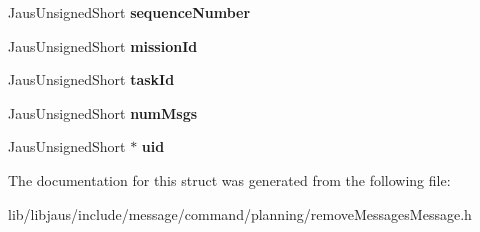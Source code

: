 \begin{DoxyCompactItemize}
\item 
\hypertarget{struct_remove_messages_message_struct_a9c36627b8a4b7d9cde2d80a104b71bc9}{\-Jaus\-Unsigned\-Short {\bfseries sequence\-Number}}\label{struct_remove_messages_message_struct_a9c36627b8a4b7d9cde2d80a104b71bc9}

\item 
\hypertarget{struct_remove_messages_message_struct_a43345f5fb3ca3d9aeff76ec574da9c4e}{\-Jaus\-Unsigned\-Short {\bfseries mission\-Id}}\label{struct_remove_messages_message_struct_a43345f5fb3ca3d9aeff76ec574da9c4e}

\item 
\hypertarget{struct_remove_messages_message_struct_a0add0d12e7c25417d840587e944a2545}{\-Jaus\-Unsigned\-Short {\bfseries task\-Id}}\label{struct_remove_messages_message_struct_a0add0d12e7c25417d840587e944a2545}

\item 
\hypertarget{struct_remove_messages_message_struct_a0b5b6786d519bfe92b3f1d6c303e9bdc}{\-Jaus\-Unsigned\-Short {\bfseries num\-Msgs}}\label{struct_remove_messages_message_struct_a0b5b6786d519bfe92b3f1d6c303e9bdc}

\item 
\hypertarget{struct_remove_messages_message_struct_a987b3c2db10faab2e2612cdbd68c0f57}{\-Jaus\-Unsigned\-Short $\ast$ {\bfseries uid}}\label{struct_remove_messages_message_struct_a987b3c2db10faab2e2612cdbd68c0f57}

\end{DoxyCompactItemize}


\-The documentation for this struct was generated from the following file\-:\begin{DoxyCompactItemize}
\item 
lib/libjaus/include/message/command/planning/remove\-Messages\-Message.\-h\end{DoxyCompactItemize}
